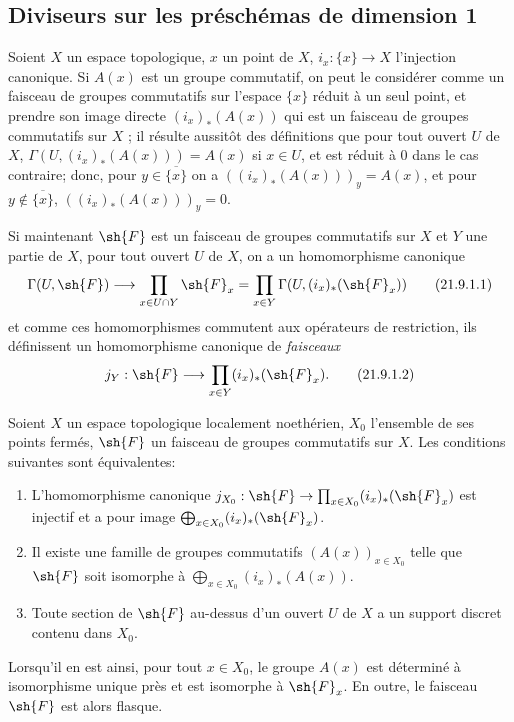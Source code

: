 \subsection{Diviseurs sur les préschémas de dimension 1}
\label{subsection:IV.21.9}
\label{IV.21.9}

\begin{env}[21.9.1]
\label{IV.21.9.1}
Soient $X$ un espace topologique, $x$ un point de $X$, $i_x:\{x\}\to X$ l'injection canonique.
Si $A(x)$ est un groupe commutatif, on peut le considérer comme un faisceau de groupes commutatifs sur l'espace $\{x\}$ réduit à un seul point, et prendre son image directe $(i_x)_*(A(x))$ qui est un faisceau de groupes commutatifs sur $X$ ;
il résulte aussitôt des définitions que pour tout ouvert $U$ de $X$, $\Gamma(U,(i_x)_*(A(x)))=A(x)$ si $x\in U$, et est réduit à $0$ dans le cas contraire;
donc, pour $y\in\overline{\{x\}}$ on a $((i_x)_*(A(x)))_y=A(x)$, et pour $y\notin\overline{\{x\}}$, $((i_x)_*(A(x)))_y=0$.

Si maintenant $\sh{F}$ est un faisceau de groupes commutatifs sur $X$ et $Y$ une partie de $X$, pour tout ouvert $U$ de $X$, on a un homomorphisme canonique
\[
\label{IV.21.9.1.1}
  \Gamma(U,\sh{F})\to\prod_{x\in U\cap Y}\sh{F}_x
  =\prod_{x\in Y}\Gamma(U,(i_x)_*(\sh{F}_x))
  \tag{21.9.1.1}
\]
et comme ces homomorphismes commutent aux opérateurs de restriction, ils définissent un homomorphisme canonique de \emph{faisceaux}
\[
\label{IV.21.9.1.2}
  j_Y:\sh{F}\to\prod_{x\in Y}(i_x)_*(\sh{F}_x).
  \tag{21.9.1.2}
\]
\end{env}

\begin{lemma}[21.9.2]
\label{IV.21.9.2}
Soient $X$ un espace topologique localement noethérien, $X_0$ l'ensemble de ses points fermés, $\sh{F}$ un faisceau de groupes commutatifs sur $X$.
Les conditions suivantes sont équivalentes:
\begin{enumerate}[label=\emph{\alph*)}]
  \item L'homomorphisme canonique $j_{X_0}:\sh{F}\to\prod_{x\in X_0}(i_x)_*(\sh{F}_x)$ est injectif et a pour image $\bigoplus_{x\in X_0}(i_x)_*(\sh{F}_x)$.
  \item[\rm a$'$)] Il existe une famille de groupes commutatifs $(A(x))_{x\in X_0}$ telle que $\sh{F}$ soit isomorphe à $\bigoplus_{x\in X_0}(i_x)_*(A(x))$.
  \item Toute section de $\sh{F}$ au-dessus d'un ouvert $U$ de $X$ a un support discret contenu dans $X_0$.
\end{enumerate}
Lorsqu'il en est ainsi, pour tout $x\in X_0$, le groupe $A(x)$ est déterminé à isomorphisme unique près et est isomorphe à $\sh{F}_x$.
En outre, le faisceau $\sh{F}$ est alors flasque.
\end{lemma}


